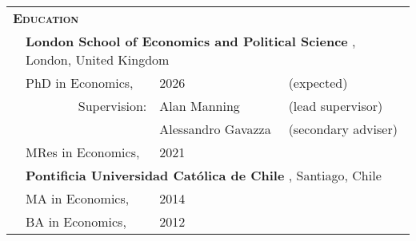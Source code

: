 \begin{tabular}{llll}

	\multicolumn{3}{l}{
		\large
		\textbf{%
			\textsc{%
				Education
			}
		}
	}
	\\[2ex]

	\indent
	&
	\multicolumn{3}{l}{
		\textbf{%
			London School of Economics and Political Science%
		}%
		,
		London,
		United Kingdom
	}
	\\[.5ex]
	
	  
	& PhD in Economics,
	& 2026
	& \scriptsize (expected)
	\\%
	
	& \multicolumn{1}{r}{\footnotesize Supervision:}
	& \footnotesize Alan Manning
	& \scriptsize (lead supervisor)
	\\[-.5ex]
	&
	& \footnotesize Alessandro Gavazza
	& \scriptsize (secondary adviser)
	\\[.5ex]
	  
	& MRes in Economics,
	& 2021
	\\[1.1em]
	
	&
	\multicolumn{3}{l}{
		\textbf{%
			Pontificia Universidad Cat\'olica de Chile%
		}%
		,
		Santiago,
		Chile
	}
	\\[.5ex]
	
	  
	& MA in Economics,
	& 2014
	\\
	
	  
	& BA in Economics,
	& 2012
	
\end{tabular}